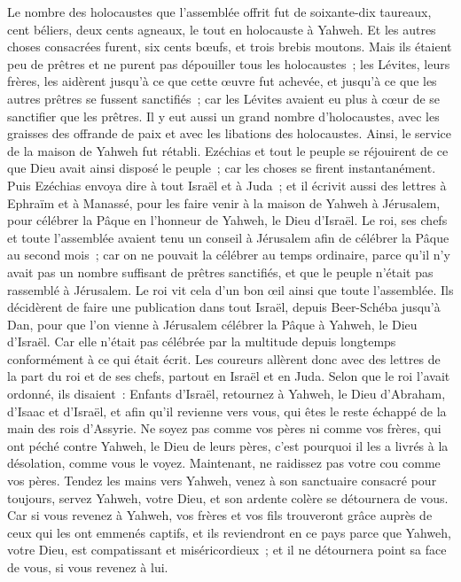 \begin{multicols}{2}
Le nombre des holocaustes que l'assemblée offrit fut de soixante-dix taureaux, cent béliers, deux cents agneaux, le tout en holocauste à Yahweh.
Et les autres choses consacrées furent, six cents bœufs, et trois brebis moutons.
Mais ils étaient peu de prêtres et ne purent pas dépouiller tous les holocaustes~; les Lévites, leurs frères, les aidèrent jusqu'à ce que cette œuvre fut achevée, et jusqu'à ce que les autres prêtres se fussent sanctifiés~; car les Lévites avaient eu plus à cœur de se sanctifier que les prêtres.
Il y eut aussi un grand nombre d'holocaustes, avec les graisses des offrande de paix et avec les libations des holocaustes. Ainsi, le service de la maison de Yahweh fut rétabli.
Ezéchias et tout le peuple se réjouirent de ce que Dieu avait ainsi disposé le peuple~; car les choses se firent instantanément.
\VerseOne{}Puis Ezéchias envoya dire à tout Israël et à Juda~; et il écrivit aussi des lettres à Ephraïm et à Manassé, pour les faire venir à la maison de Yahweh à Jérusalem, pour célébrer la Pâque en l'honneur de Yahweh, le Dieu d'Israël.
Le roi, ses chefs et toute l'assemblée avaient tenu un conseil à Jérusalem afin de célébrer la Pâque au second mois~;
car on ne pouvait la célébrer au temps ordinaire, parce qu'il n'y avait pas un nombre suffisant de prêtres sanctifiés, et que le peuple n'était pas rassemblé à Jérusalem.
Le roi vit cela d'un bon œil ainsi que toute l'assemblée.
Ils décidèrent de faire une publication dans tout Israël, depuis Beer-Schéba jusqu'à Dan, pour que l'on vienne à Jérusalem célébrer la Pâque à Yahweh, le Dieu d'Israël. Car elle n'était pas célébrée par la multitude depuis longtemps conformément à ce qui était écrit.
Les coureurs allèrent donc avec des lettres de la part du roi et de ses chefs, partout en Israël et en Juda. Selon que le roi l'avait ordonné, ils disaient~: Enfants d'Israël, retournez à Yahweh, le Dieu d'Abraham, d'Isaac et d'Israël, et afin qu'il revienne vers vous, qui êtes le reste échappé de la main des rois d'Assyrie.
Ne soyez pas comme vos pères ni comme vos frères, qui ont péché contre Yahweh, le Dieu de leurs pères, c'est pourquoi il les a livrés à la désolation, comme vous le voyez.
Maintenant, ne raidissez pas votre cou comme vos pères. Tendez les mains vers Yahweh, venez à son sanctuaire consacré pour toujours, servez Yahweh, votre Dieu, et son ardente colère se détournera de vous.
Car si vous revenez à Yahweh, vos frères et vos fils trouveront grâce auprès de ceux qui les ont emmenés captifs, et ils reviendront en ce pays parce que Yahweh, votre Dieu, est compatissant et miséricordieux~; et il ne détournera point sa face de vous, si vous revenez à lui.

\end{multicols}
